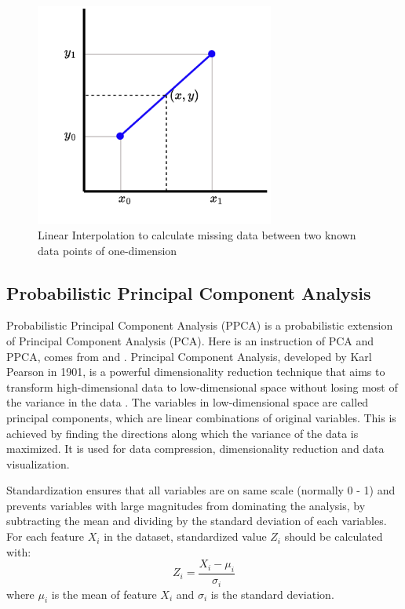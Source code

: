\documentclass[12pt,a4paper,english
]{tunithesis}
\begin{document}
\begin{figure}
  \begin{center}
    \includegraphics[width=0.7\textwidth]{thesis/img/linear_impute.pdf}
  \end{center}
  \caption[Linear Interpolation]{Linear Interpolation to calculate missing data between two known data points of one-dimension}
  \label{fig:linear_impute_fig}
\end{figure}

\subsection{Probabilistic Principal Component Analysis}
Probabilistic Principal Component Analysis (PPCA) is a probabilistic extension of Principal Component Analysis (PCA). Here is an instruction of PCA and PPCA, comes from \textcite{lindsay2002} and \textcite{tipping2002}.
Principal Component Analysis, developed by Karl Pearson in 1901, is a powerful dimensionality reduction technique that aims to transform high-dimensional data to low-dimensional space without losing most of the variance in the data \parencite{mackiewicz1993}. The variables in low-dimensional space are called principal components, which are linear combinations of original variables. This is achieved by finding the directions along which the variance of the data is maximized. It is used for data compression, dimensionality reduction and data visualization. 

Standardization ensures that all variables are on same scale (normally 0 - 1) and prevents variables with large magnitudes from dominating the analysis, by subtracting the mean and dividing by the standard deviation of each variables. For each feature $X_i$ in the dataset, standardized value $Z_i$ should be calculated with: %
\begin{equation}
    \label{eq:ppca_standardized_value}
    {Z_i} = {\frac {{X_i}-{\mu_i}}{\sigma_i}}
\end{equation}
where $\mu_i$ is the mean of feature $X_i$ and $\sigma_i$ is the standard deviation.
\end{document}
